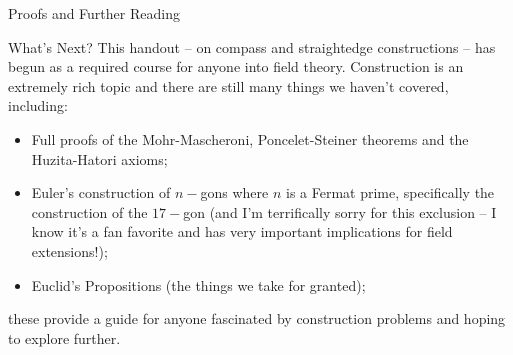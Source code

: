 \documentclass[12pt]{article}
\theoremstyle{definition}
\theoremstyle{definition}
\theoremstyle{definition}
\theoremstyle{definition}
\theoremstyle{definition}
\theoremstyle{definition}
\theoremstyle{definition}
\begin{document}
\begin{section}{Proofs and Further Reading}
    \begin{subsection}{What's Next?}
        This handout -- on compass and straightedge constructions -- has begun as a required course for anyone into field theory. Construction is an extremely rich topic and there are still many things we haven't 
        covered, including:
        \begin{itemize}
            \item Full proofs of the Mohr-Mascheroni, Poncelet-Steiner theorems and the Huzita-Hatori axioms;
            \item Euler's construction of \(n-\)gons where \(n\) is a Fermat prime, specifically the construction of the \(17-\)gon (and I'm terrifically sorry for this exclusion -- I know it's a fan favorite 
            and has very important implications for field extensions!);
            \item Euclid's Propositions (the things we take for granted);
        \end{itemize}
        \noindent these provide a guide for anyone fascinated by construction problems and hoping to explore further.
    \end{subsection}
\end{section}
\end{document}
